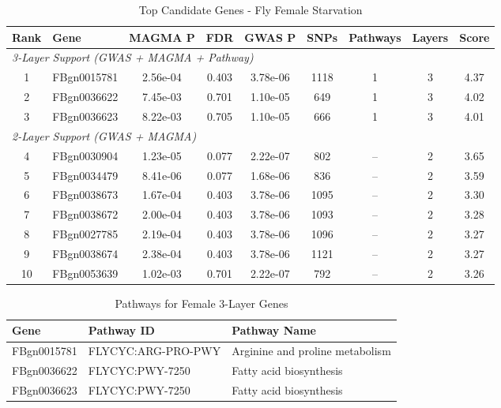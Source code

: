 \documentclass[11pt]{article}
\begin{document}
\begin{table}[h!]
\centering
\caption{Top Candidate Genes - Fly Female Starvation}
\small
\begin{tabular}{clccccccc}
\toprule
\textbf{Rank} & \textbf{Gene} & \textbf{MAGMA P} & \textbf{FDR} & \textbf{GWAS P} & \textbf{SNPs} & \textbf{Pathways} & \textbf{Layers} & \textbf{Score} \\
\midrule
\multicolumn{9}{l}{\textit{3-Layer Support (GWAS + MAGMA + Pathway)}} \\
1 & FBgn0015781 & 2.56e-04 & 0.403 & 3.78e-06 & 1118 & 1 & 3 & 4.37 \\
2 & FBgn0036622 & 7.45e-03 & 0.701 & 1.10e-05 & 649 & 1 & 3 & 4.02 \\
3 & FBgn0036623 & 8.22e-03 & 0.705 & 1.10e-05 & 666 & 1 & 3 & 4.01 \\
\midrule
\multicolumn{9}{l}{\textit{2-Layer Support (GWAS + MAGMA)}} \\
4 & FBgn0030904 & 1.23e-05 & 0.077 & 2.22e-07 & 802 & -- & 2 & 3.65 \\
5 & FBgn0034479 & 8.41e-06 & 0.077 & 1.68e-06 & 836 & -- & 2 & 3.59 \\
6 & FBgn0038673 & 1.67e-04 & 0.403 & 3.78e-06 & 1095 & -- & 2 & 3.30 \\
7 & FBgn0038672 & 2.00e-04 & 0.403 & 3.78e-06 & 1093 & -- & 2 & 3.28 \\
8 & FBgn0027785 & 2.19e-04 & 0.403 & 3.78e-06 & 1096 & -- & 2 & 3.27 \\
9 & FBgn0038674 & 2.38e-04 & 0.403 & 3.78e-06 & 1121 & -- & 2 & 3.27 \\
10 & FBgn0053639 & 1.02e-03 & 0.701 & 2.22e-07 & 792 & -- & 2 & 3.26 \\
\bottomrule
\end{tabular}
\label{tab:female_genes}
\end{table}

\begin{table}[h!]
\centering
\caption{Pathways for Female 3-Layer Genes}
\begin{tabular}{lll}
\toprule
\textbf{Gene} & \textbf{Pathway ID} & \textbf{Pathway Name} \\
\midrule
FBgn0015781 & FLYCYC:ARG-PRO-PWY & Arginine and proline metabolism \\
FBgn0036622 & FLYCYC:PWY-7250 & Fatty acid biosynthesis \\
FBgn0036623 & FLYCYC:PWY-7250 & Fatty acid biosynthesis \\
\bottomrule
\end{tabular}
\label{tab:female_pathways}
\end{table}
\end{document}
